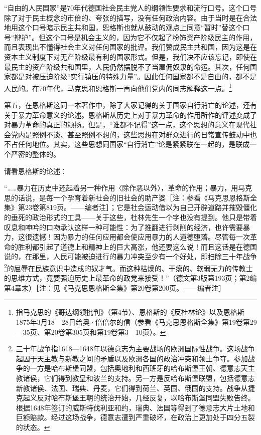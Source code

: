 \documentclass[UTF8, 12pt, a4paper]{ctexrep}
\begin{document}
“自由的人民国家”是70年代德国社会民主党人的纲领性要求和流行口号。这个口号除了对于民主概念的市侩的、夸张的描写，没有任何政治内容。由于当时是在合法地用这个口号暗示民主共和国，恩格斯也就从鼓动的观点上同意“暂时”替这个口号“辩护”。但这个口号是机会主义的，因为它不仅起了粉饰资产阶级民主的作用，而且表现出不懂得社会主义对任何国家的批评。我们赞成民主共和国，因为这是在资本主义制度下对无产阶级最有利的国家形式。但是，我们决不应该忘记，即使在最民主的资产阶级共和国里，人民仍然摆脱不了当雇佣奴隶的命运。其次，任何国家都是对被压迫阶级“实行镇压的特殊力量”。因此任何国家都不是自由的，都不是人民的。在70年代，马克思和恩格斯一再向他们党内的同志解释这一点。\footnote{指马克思的《哥达纲领批判》（第4节）、恩格斯的《反杜林论》以及恩格斯1875年3月18—28日给奥·倍倍尔的信（参看《马克思恩格斯全集》第19卷第29—35页、第20卷第305页和第19卷第3—10页）。}

第五，在恩格斯这同一本著作中，除了大家记得的关于国家自行消亡的论述，还有关于暴力革命意义的论述。恩格斯从历史上对于暴力革命的作用所作的评述变成了对暴力革命的真正的颂扬。但是，“谁都不记得”这一点，这个思想的意义在现代社会党内是照例不谈、甚至照例不想的，这些思想在对群众进行的日常宣传鼓动中也不占任何地位。其实，这些思想同国家“自行消亡”论是紧紧联在一起的，是联成一个严密的整体的。

请看恩格斯的论述：

“……暴力在历史中还起着另一种作用〈除作恶以外〉，革命的作用；暴力，用马克思的话说，是每一个孕育着新社会的旧社会的助产婆［注：参看《马克思恩格斯全集》第23卷第819页。——编者注］；它是社会运动借以为自己开辟道路并摧毁僵化的垂死的政治形式的工具——关于这些，杜林先生一个字也没有提到。他只是带着叹息和呻吟的口吻承认这样一种可能性：为了推翻进行剥削的经济，也许需要暴力，这很遗憾！因为暴力的任何应用都会使应用暴力的人道德堕落。尽管每一次革命的胜利都引起了道德上和精神上的巨大高涨，他还要这么说！而且这话是在德国说的，在那里，人民可能被迫进行的暴力冲突至少有一个好处，即扫除三十年战争\footnote{三十年战争指1618—1648年以德意志为主要战场的欧洲国际性战争。这场战争起因于天主教与新教之间的矛盾以及欧洲各国的政治冲突和领土争夺。参加战争的一方是哈布斯堡同盟，包括奥地利和西班牙的哈布斯堡王朝、德意志天主教诸侯，它们得到教皇和波兰的支持。另一方是反哈布斯堡联盟，包括德意志新教诸侯、法国、瑞典、丹麦，它们得到荷兰、英国、俄国的支持。战争从捷克起义反对哈布斯堡王朝的统治开始，几经反复，以哈布斯堡同盟失败告终。根据1648年签订的威斯特伐利亚和约，瑞典、法国等得到了德意志大片土地和巨额赔款。经过这场战争，德意志遭到严重破坏，在政治上更加处于四分五裂的状态。}的屈辱在民族意识中造成的奴才气。而这种枯燥的、干瘪的、软弱无力的传教士的思维方式，竟要强迫历史上最革命的政党来接受！”（德文第3版第193页；第2编第4章末）［注：见《马克思恩格斯全集》第20卷第200页。——编者注］
\end{document}
